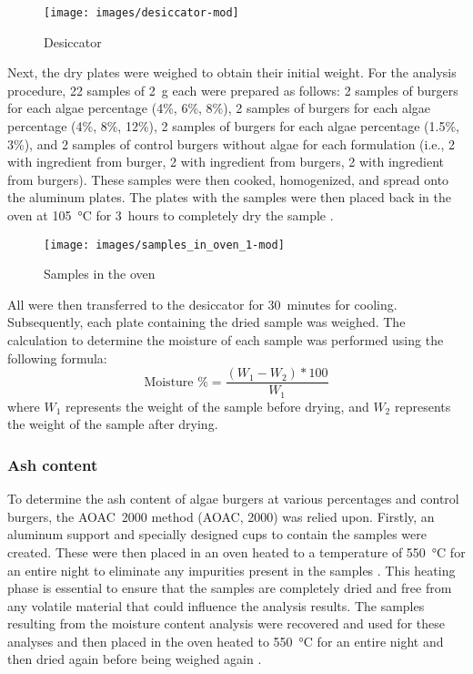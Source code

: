 \begin{figure}[H]
	\centering
	\texttt{[image: images/desiccator-mod]}
	\caption{Desiccator}
	\label{fig:desiccator}
\end{figure}

Next, the dry plates were weighed to obtain their initial weight. For the analysis procedure, \num{22} samples of \qty{2}{\gram} each were prepared as follows: \num{2} samples of  burgers for each algae percentage (4\%, 6\%, 8\%), \num{2} samples of  burgers for each algae percentage (4\%, 8\%, 12\%), \num{2} samples of  burgers for each algae percentage (1.5\%, 3\%), and 2 samples of control burgers without algae for each formulation (i.e., 2 with ingredient from  burger, 2 with ingredient from  burgers, 2 with ingredient from  burgers). These samples were then cooked, homogenized, and spread onto the aluminum plates. The plates with the samples were then placed back in the oven at \qty{105}{\degreeCelsius} for \qty{3}{hours} to completely dry the sample .

\begin{figure}[H]
	\centering
	\texttt{[image: images/samples\_in\_oven\_1-mod]}
	\caption{Samples in the oven}
	\label{fig:samples_in_oven_1}
\end{figure}

All were then transferred to the desiccator for \qty{30}{minutes} for cooling. Subsequently, each plate containing the dried sample was weighed. The calculation to determine the moisture of each sample was performed using the following formula:\zxriv{}
\[
	\text{Moisture \%} = \frac{(W_1 - W_2) * 100}{W_1}
\]
where $ W_1 $ represents the weight of the sample before drying, and $ W_2 $ represents the weight of the sample after drying.


\subsubsection{Ash content}
To determine the ash content of algae burgers at various percentages and control burgers, the AOAC~2000 method (AOAC, 2000\zxriv{}) was relied upon. Firstly, an aluminum support and specially designed cups to contain the samples were created. These were then placed in an oven heated to a temperature of \qty{550}{\degreeCelsius} for an entire night to eliminate any impurities present in the samples . This heating phase is essential to ensure that the samples are completely dried and free from any volatile material that could influence the analysis results. The samples resulting from the moisture content analysis were recovered and used for these analyses and then placed in the oven heated to \qty{550}{\degreeCelsius} for an entire night and then dried again before being weighed again .

